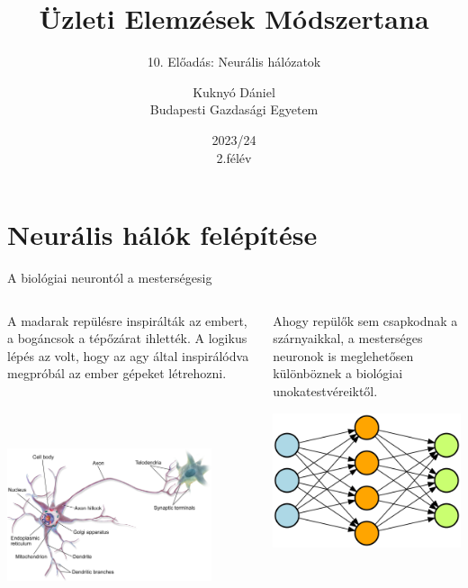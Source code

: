 \documentclass[english, aspectratio=169]{beamer}
\makeatletter
\newcommand\makebeamertitle{\frame{\maketitle}}
\let\origtableofcontents=\tableofcontents
\def\tableofcontents{\@ifnextchar[{\origtableofcontents}{\gobbletableofcontents}}
\def\gobbletableofcontents#1{\origtableofcontents}
\makeatother
\begin{document}
\section{Neurális hálók felépítése}
\title[]{Üzleti Elemzések Módszertana}
\subtitle{10. Előadás: Neurális hálózatok}
\author[Kuknyó Dániel]{Kuknyó Dániel\\Budapesti Gazdasági Egyetem}
\date{2023/24\\2.félév}
\makebeamertitle

\begin{frame}
\tableofcontents{}
\end{frame}

\begin{frame}
\tableofcontents[currentsection]
\end{frame}

\begin{frame}{A biológiai neurontól a mesterségesig}
\begin{columns}
\begin{column}{.5\textwidth}
A madarak repülésre inspirálták az embert, a bogáncsok a tépőzárat ihlették. A logikus lépés az volt, hogy az agy által inspirálódva megpróbál az ember gépeket létrehozni.
\begin{center}
\includegraphics[width=6cm, height=7cm, keepaspectratio]{images/neural_1.png}
\end{center}
\end{column}
\begin{column}{.5\textwidth}
Ahogy repülők sem csapkodnak a szárnyaikkal, a mesterséges neuronok is meglehetősen különböznek a biológiai unokatestvéreiktől.
\begin{center}
\includegraphics[width=6cm, keepaspectratio]{graphs/neural_1.png}
\end{center}
\end{column}
\end{columns}
\end{frame}
\end{document}
